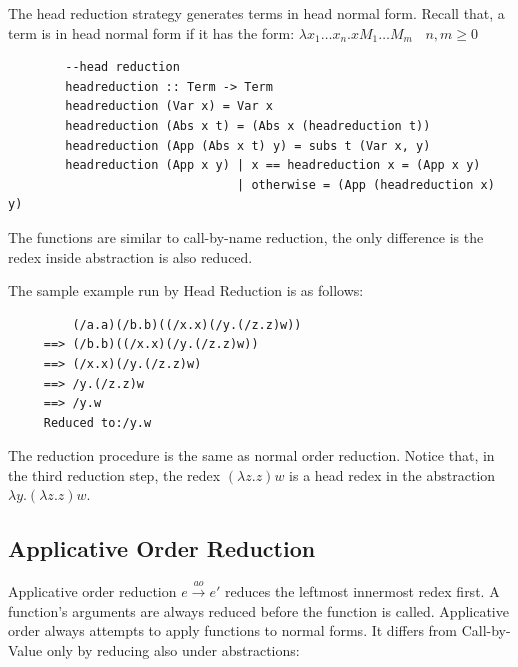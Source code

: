 The head reduction strategy generates terms in head normal form. Recall that, a term is in head normal form if it has the form: $\lambda x_1\ldots x_n.xM_1\ldots M_m\ \ \ \ n,m\geqslant 0$

\begin{verbatim}
        --head reduction
        headreduction :: Term -> Term
        headreduction (Var x) = Var x
        headreduction (Abs x t) = (Abs x (headreduction t))
        headreduction (App (Abs x t) y) = subs t (Var x, y)
        headreduction (App x y) | x == headreduction x = (App x y)
                                | otherwise = (App (headreduction x) y)  
\end{verbatim}

The functions are similar to call-by-name reduction, the only difference is the redex inside abstraction is also reduced.

\begin{exmp}
\normalfont The sample example run by Head Reduction is as follows:
\end{exmp}

\begin{verbatim}
         (/a.a)(/b.b)((/x.x)(/y.(/z.z)w))
     ==> (/b.b)((/x.x)(/y.(/z.z)w))
     ==> (/x.x)(/y.(/z.z)w)
     ==> /y.(/z.z)w
     ==> /y.w
     Reduced to:/y.w
\end{verbatim}

The reduction procedure is the same as normal order reduction. Notice that, in the third reduction step, the redex $(\lambda z.z)w$ is a head redex in the abstraction $\lambda y.(\lambda z.z)w$. 

\subsection{Applicative Order Reduction}

Applicative order reduction $e\xrightarrow{ao} e'$ reduces the leftmost innermost redex first. A function's arguments are always reduced before the function is called. Applicative order always attempts to apply functions to normal forms. It differs from Call-by-Value only by reducing also under abstractions:


